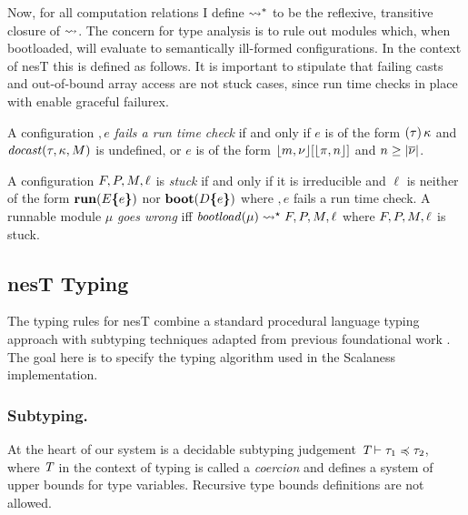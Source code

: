 Now, for all computation relations I define $\leadsto^*$ to be the reflexive, transitive closure
of $\leadsto$. The concern for type analysis is to rule out modules which, when bootloaded, will
evaluate to semantically ill-formed configurations. In the context of nesT this is defined as
follows. It is important to stipulate that failing casts and out-of-bound array access are not
stuck cases, since run time checks in place with enable graceful failurex.
\begin{definition}
  A configuration $\bm, e$ \emph{fails a run time check} if and only if $e$ is of the form
  $(\tau)\,\kappa$ and $\mathit{docast}(\tau,\kappa,M)$ is undefined, or $e$ is of the form
  $\lfloor m,{\nu} \rfloor[\lfloor \pi,n \rfloor]$ and $n\ge|\overline{{\nu}}|$.
\end{definition}

\begin{definition}
  \label{def-runnable}
  A configuration $F, P, M, \ell$ is \emph{stuck} if and only if it is irreducible
  and $\ell$ is neither of the form $\mathbf{run}(E\textup{\textbf{\{}} e\textup{\textbf{\}}})$ nor $\mathbf{boot}(D\textup{\textbf{\{}} e\textup{\textbf{\}}})$
  where $\bm, e$ fails a run time check. A runnable module $\mu$ \emph{goes wrong} iff
  $\mathit{bootload}(\mu) \leadsto^\star F, P, M, \ell $ where $F, P, M, \ell$
  is stuck.
\end{definition}

\subjudgefig

\coretypingfig

\declmodtypingfig

\subsection{nesT Typing} 
\label{section-nesttyping}

The typing rules for nesT combine a standard procedural language typing approach with subtyping
techniques adapted from previous foundational work \cite{FramedML,Ghelli199875}. The goal here
is to specify the typing algorithm used in the Scalaness implementation.

\subsubsection{Subtyping.}
At the heart of our system is a decidable subtyping judgement $\textit{T} \vdash \tau_1 \preccurlyeq \tau_2$,
where $\textit{T}$ in the context of typing is called a \emph{coercion} and defines a system of
upper bounds for type variables. Recursive type bounds definitions are not allowed.

